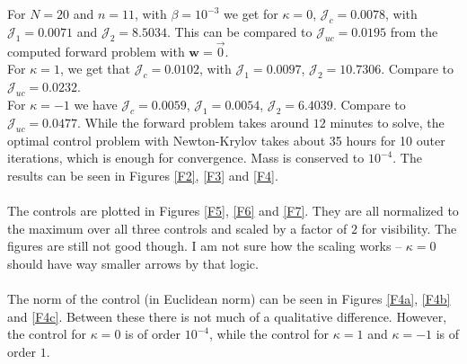 \documentclass[11pt, a4paper]{article}
\theoremstyle{definition}
\newcommand{\w}{\mathbf{w}}
\begin{document}
	For $N = 20$ and $n = 11$, with $\beta = 10^{-3}$ we get for $\kappa = 0$, $\mathcal J_c = 0.0078$, with $\mathcal J_1 = 0.0071$ and $\mathcal J_2 = 8.5034$.
	This can be compared to $\mathcal J_{uc} = 0.0195$ from the computed forward problem with $\w = \vec 0$.\\
	For $\kappa = 1$, we get that $\mathcal J_c = 0.0102$, with $\mathcal J_1 = 0.0097$, $\mathcal J_2 = 10.7306$. Compare to $\mathcal J_{uc} = 0.0232$. \\
	For $\kappa = -1$ we have $\mathcal J_c = 0.0059$, $\mathcal J_1 = 0.0054$, $\mathcal J_2 = 6.4039$. Compare to $\mathcal J_{uc} = 0.0477$.
	While the forward problem takes around $12$ minutes to solve, the optimal control problem with Newton-Krylov takes about 35 hours for 10 outer iterations, which is enough for convergence. Mass is conserved to $10^{-4}$. The results can be seen in Figures \ref{F2}, \ref{F3} and \ref{F4}. 
	\\
	\\
	The controls are plotted in Figures \ref{F5}, \ref{F6} and \ref{F7}. They are all normalized to the maximum over all three controls and scaled by a factor of $2$ for visibility. The figures are still not good though. I am not sure how the scaling works -- $\kappa = 0$ should have way smaller arrows by that logic.
	\\
	\\
	The norm of the control  (in Euclidean norm) can be seen in Figures \ref{F4a}, \ref{F4b} and \ref{F4c}. Between these there is not much of a qualitative difference. However, the control for $\kappa = 0$ is of order $10^{-4}$, while the control for $\kappa = 1$ and $\kappa = -1$ is of order $1$.
	
	
	
\end{document}

